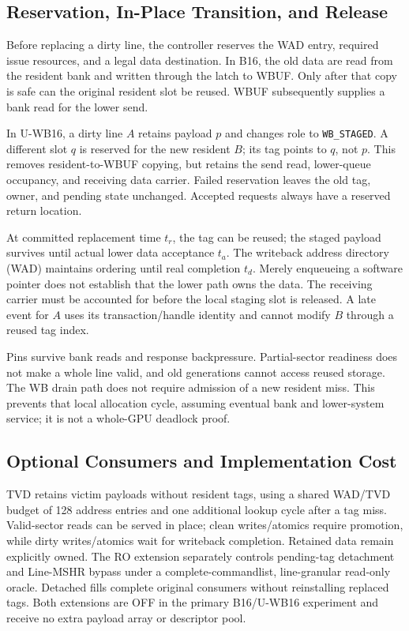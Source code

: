 \documentclass[conference,letterpaper]{IEEEtran}
\newcommand{\base}{B16}
\newcommand{\unif}{U-WB16}
\begin{document}
\subsection{Reservation, In-Place Transition, and Release}
Before replacing a dirty line, the controller reserves the WAD entry, required issue resources, and a legal data destination. In \base{}, the old data are read from the resident bank and written through the latch to WBUF. Only after that copy is safe can the original resident slot be reused. WBUF subsequently supplies a bank read for the lower send.

In \unif{}, a dirty line $A$ retains payload $p$ and changes role to \texttt{WB\_STAGED}. A different slot $q$ is reserved for the new resident $B$; its tag points to $q$, not $p$. This removes resident-to-WBUF copying, but retains the send read, lower-queue occupancy, and receiving data carrier. Failed reservation leaves the old tag, owner, and pending state unchanged. Accepted requests always have a reserved return location.

At committed replacement time $t_r$, the tag can be reused; the staged payload survives until actual lower data acceptance $t_a$. The writeback address directory (WAD) maintains ordering until real completion $t_d$. Merely enqueueing a software pointer does not establish that the lower path owns the data. The receiving carrier must be accounted for before the local staging slot is released. A late event for $A$ uses its transaction/handle identity and cannot modify $B$ through a reused tag index.

Pins survive bank reads and response backpressure. Partial-sector readiness does not make a whole line valid, and old generations cannot access reused storage. The WB drain path does not require admission of a new resident miss. This prevents that local allocation cycle, assuming eventual bank and lower-system service; it is not a whole-GPU deadlock proof.

\subsection{Optional Consumers and Implementation Cost}
TVD retains victim payloads without resident tags, using a shared WAD/TVD budget of 128 address entries and one additional lookup cycle after a tag miss. Valid-sector reads can be served in place; clean writes/atomics require promotion, while dirty writes/atomics wait for writeback completion. Retained data remain explicitly owned. The RO extension separately controls pending-tag detachment and Line-MSHR bypass under a complete-commandlist, line-granular read-only oracle. Detached fills complete original consumers without reinstalling replaced tags. Both extensions are OFF in the primary \base{}/\unif{} experiment and receive no extra payload array or descriptor pool.
\end{document}
